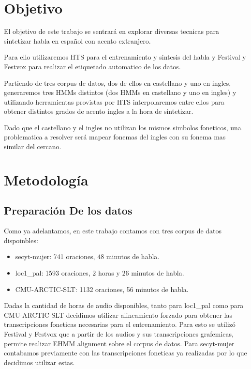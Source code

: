 \section{Objetivo}

El objetivo de este trabajo se sentrará en explorar diversas tecnicas para sintetizar habla en español con acento extranjero. 


Para ello utilizaremos HTS para el entrenamiento y sintesis del habla y Festival y Festvox para realizar el etiquetado automatico de los datos.


Partiendo de tres corpus de datos, dos de ellos en castellano y uno en ingles, generaremos tres HMMs distintos (dos HMMs en castellano y uno en ingles) y utilizando herramientas provistas por HTS interpolaremos entre ellos para obtener distintos grados de acento ingles a la hora de sintetizar.


Dado que el castellano y el ingles no utilizan los mismos simbolos foneticos, una problematica a resolver será mapear fonemas del ingles con su fonema mas similar del cercano.

\section{Metodología}

\subsection{Preparación De los datos}

Como ya adelantamos, en este trabajo contamos con tres corpus de datos dispoinbles:

\begin{itemize}
\item secyt-mujer: 741 oraciones, $48$ minutos de habla.
\item loc1_pal: 1593 oraciones, $2$ horas y $26$ minutos de habla.
\item CMU-ARCTIC-SLT: 1132 oraciones, 56 minutos de habla.
\end{itemize}

Dadas la cantidad de horas de audio disponibles, tanto para loc1_pal como para CMU-ARCTIC-SLT decidimos utilizar alineamiento forzado para obtener las transcripciones foneticas necesarias para el entrenamiento. Para esto se utilizó Festival y Festvox que a partir de los audios y sus transcripciones grafemicas, permite realizar EHMM alignment sobre el corpus de datos. Para secyt-mujer contabamos previamente con las transcripciones foneticas ya realizadas por lo que decidimos utilizar estas. 


